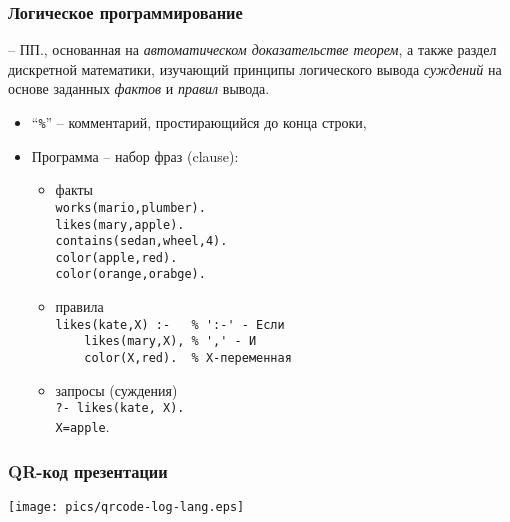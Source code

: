\documentclass[10pt]{beamer}
\begin{document}
\begin{frame}[fragile]
  \frametitle{Логическое программирование}
  -- ПП., основанная на \emph{автоматическом доказательстве теорем}, а также раздел дискретной математики, изучающий принципы логического вывода \emph{суждений} на основе заданных \emph{фактов} и \emph{правил} вывода.
  \begin{itemize}
  \item ``\verb|%|'' -- комментарий, простирающийся до конца строки,
  \item Программа -- набор фраз (clause):
    \begin{itemize}
    \item факты \\ \verb|works(mario,plumber).|\\\verb|likes(mary,apple).|\\ \verb|contains(sedan,wheel,4).|\\
      \verb|color(apple,red).|\\
      \verb|color(orange,orabge).|
    \item правила \\ \verb|likes(kate,X) :-   % ':-' - Если |\\
      \verb|    likes(mary,X), % ',' - И |\\
      \verb|    color(X,red).  % X-переменная|
    \item запросы (суждения) \\ \verb|?- likes(kate, X).|\\\verb|X=apple|.
    \end{itemize}
  \end{itemize}
\end{frame}

\begin{frame}
  \frametitle{QR-код презентации}
  \centering
  \texttt{[image: pics/qrcode-log-lang.eps]}
\end{frame}
\end{document}

